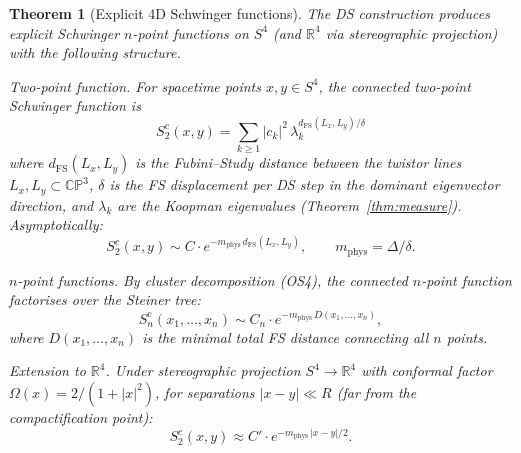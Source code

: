 \documentclass[11pt,a4paper]{article}
\newtheorem{theorem}{Theorem}[section]
\theoremstyle{definition}
\theoremstyle{remark}
\newcommand{\CP}{\mathbb{CP}}
\newcommand{\R}{\mathbb{R}}
\begin{document}
\begin{theorem}[Explicit 4D Schwinger functions]\label{thm:schwinger4d}
The DS construction produces explicit Schwinger $n$-point functions on $S^4$ (and $\R^4$ via stereographic projection) with the following structure.

\emph{Two-point function.} For spacetime points $x,y\in S^4$, the connected two-point Schwinger function is
\begin{equation}\label{eq:schwinger4d}
S_2^c(x,y)=\sum_{k\geq 1}|c_k|^2\,\lambda_k^{d_{\mathrm{FS}}(L_x,L_y)/\delta}
\end{equation}
where $d_{\mathrm{FS}}(L_x,L_y)$ is the Fubini--Study distance between the twistor lines $L_x,L_y\subset\CP^3$, $\delta$ is the FS displacement per DS step in the dominant eigenvector direction, and $\lambda_k$ are the Koopman eigenvalues (Theorem~\ref{thm:measure}). Asymptotically:
\begin{equation}
S_2^c(x,y)\sim C\cdot e^{-m_{\mathrm{phys}}\,d_{\mathrm{FS}}(L_x,L_y)},\qquad m_{\mathrm{phys}}=\Delta/\delta.
\end{equation}

\emph{$n$-point functions.} By cluster decomposition (OS4), the connected $n$-point function factorises over the Steiner tree:
\[
S_n^c(x_1,\ldots,x_n)\sim C_n\cdot e^{-m_{\mathrm{phys}}\,D(x_1,\ldots,x_n)},
\]
where $D(x_1,\ldots,x_n)$ is the minimal total FS distance connecting all $n$ points.

\emph{Extension to $\R^4$.} Under stereographic projection $S^4\to\R^4$ with conformal factor $\Omega(x)=2/(1+|x|^2)$, for separations $|x-y|\ll R$ (far from the compactification point):
\[
S_2^c(x,y)\approx C'\cdot e^{-m_{\mathrm{phys}}\,|x-y|/2}.
\]
\end{theorem}
\end{document}
